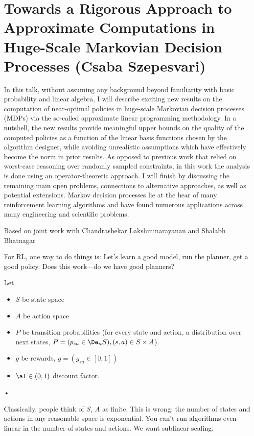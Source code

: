 \section{Towards a Rigorous Approach to Approximate Computations in Huge-Scale Markovian Decision Processes (Csaba Szepesvari)}

In this talk, without assuming any background beyond familiarity with basic probability and linear algebra, I will describe exciting new results on the computation of near-optimal policies in huge-scale Markovian decision processes (MDPs) via the so-called approximate linear programming methodology. In a nutshell, the new results provide meaningful upper bounds on the quality of the computed policies as a function of the linear basis functions chosen by the algorithm designer, while avoiding unrealistic assumptions which have effectively become the norm in prior results. As opposed to previous work that relied on worst-case reasoning over randomly sampled constraints, in this work the analysis is done using an operator-theoretic approach. I will finish by discussing the remaining main open problems, connections to alternative approaches, as well as potential extensions. Markov decision processes lie at the hear of many reinforcement learning algorithms and have found numerous applications across many engineering and scientific problems.

Based on joint work with Chandrashekar Lakshminarayanan and Shalabh Bhatnagar

For RL, one way to do things is: Let's learn a good model, run the planner, get a good policy. Does this work---do we have good planners?

Let
\begin{itemize}
\item
$S$ be state space
\item
$A$ be action space
\item
$P$ be transition probabilities (for every state and action, a distribution over next states, $P=(p_{sa}\in \De_nS), (s,a)\in S\times A$). 
\item
$g$ be rewards, $g=(g_{sa}\in [0,1])$
\item
$\al\in (0,1)$ discount factor.
\end{itemize}•

Classically, people think of $S$, $A$ as finite. This is wrong: the number of states and actions in any reasonable space is exponential. You can't run algorithms even linear in the number of states and actions. We want sublinear scaling.

